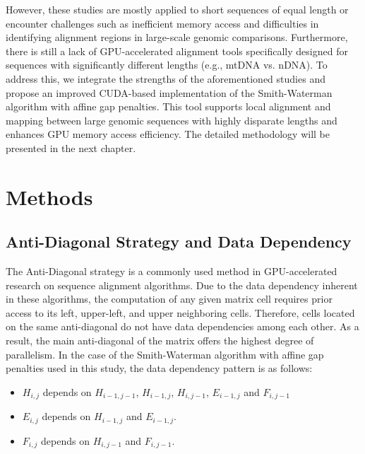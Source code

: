 \documentclass[PhD]{PHlab-thesis}
\begin{document}
However, these studies are mostly applied to short sequences of equal length or encounter challenges such as inefficient memory access and difficulties in identifying alignment regions in large-scale genomic comparisons. Furthermore, there is still a lack of GPU-accelerated alignment tools specifically designed for sequences with significantly different lengths (e.g., mtDNA vs. nDNA). To address this, we integrate the strengths of the aforementioned studies and propose an improved CUDA-based implementation of the Smith-Waterman algorithm with affine gap penalties. This tool supports local alignment and mapping between large genomic sequences with highly disparate lengths and enhances GPU memory access efficiency. The detailed methodology will be presented in the next chapter.











\chapter{Methods}
\section{Anti-Diagonal Strategy and Data Dependency}
The Anti-Diagonal strategy is a commonly used method in GPU-accelerated research on sequence alignment algorithms. Due to the data dependency inherent in these algorithms, the computation of any given matrix cell requires prior access to its left, upper-left, and upper neighboring cells. Therefore, cells located on the same anti-diagonal do not have data dependencies among each other. As a result, the main anti-diagonal of the matrix offers the highest degree of parallelism. In the case of the Smith-Waterman algorithm with affine gap penalties used in this study, the data dependency pattern is as follows:

\begin{itemize}
    \item $H_{i,j}$ depends on $H_{i-1,j-1}$, $H_{i-1,j}$, $H_{i,j-1}$, $E_{i-1,j}$ and $F_{i,j-1}$ 
    \item $E_{i,j}$ depends on $H_{i-1,j}$ and $E_{i-1,j}$.
    \item $F_{i,j}$ depends on $H_{i,j-1}$ and $F_{i,j-1}$.
\end{itemize}
\end{document}
